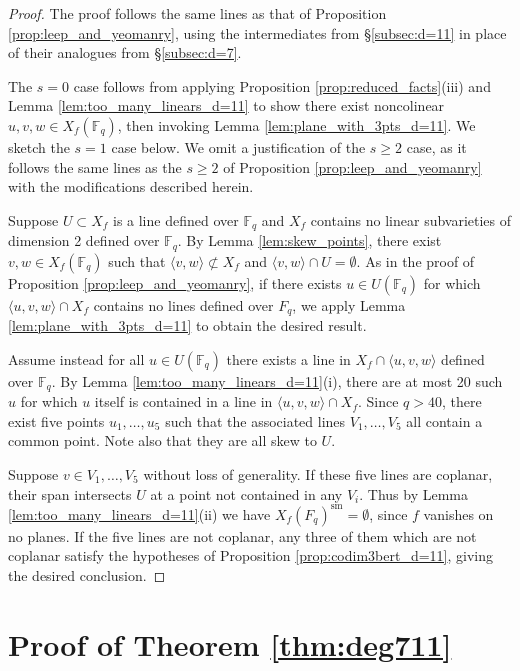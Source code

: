 \documentclass{amsart}
\newcommand{\F}{\mathbb{F}}
\newcommand{\Span}[1]{\langle #1 \rangle}
\newcommand{\sm}{\mathrm{sm}}
\theoremstyle{definition}
\numberwithin{equation}{section}
\numberwithin{table}{section}
\newcommand{\qbound}[1]{{\color{cyan}$q > {#1}$}}
\renewcommand{\qbound}[1]{{$q > {#1}$}}
\begin{document}
\begin{proof}
    The proof follows the same lines as that of Proposition \ref{prop:leep_and_yeomanry}, using the intermediates from \S \ref{subsec:d=11} in place of their analogues from \S \ref{subsec:d=7}.
    
    The $s=0$ case follows from applying Proposition \ref{prop:reduced_facts}(iii) and Lemma \ref{lem:too_many_linears_d=11} to show there exist noncolinear $u,v,w \in X_f(\F_q)$, then invoking Lemma \ref{lem:plane_with_3pts_d=11}. We sketch the $s=1$ case below. We omit a justification of the $s \geq 2$ case, as it follows the same lines as the $s \geq 2$ of Proposition \ref{prop:leep_and_yeomanry} with the modifications described herein.

    Suppose $U \subset X_f$ is a line defined over $\F_q$ and $X_f$ contains no linear subvarieties of dimension 2 defined over $\F_q$. By Lemma \ref{lem:skew_points}, there exist $v,w \in X_f(\F_q)$ such that $\Span{v,w} \not\subset X_f$ and $\Span{v,w} \cap U = \emptyset$. As in the proof of Proposition \ref{prop:leep_and_yeomanry}, if there exists $u \in U(\F_q)$ for which $\Span{u,v,w} \cap X_f$ contains no lines defined over $F_q$, we apply Lemma \ref{lem:plane_with_3pts_d=11} to obtain the desired result.

    Assume instead for all $u \in U(\F_q)$ there exists a line in  $X_f \cap \Span{u,v,w}$ defined over $\F_q$. By Lemma \ref{lem:too_many_linears_d=11}(i), there are at most 20 such $u$ for which $u$ itself is contained in a line in $\Span{u,v,w} \cap X_f$. Since \qbound{40}, there exist five points $u_1,\ldots,u_5$ such that the associated lines $V_1,\ldots,V_5$ all contain a common point. Note also that they are all skew to $U$.
    
    Suppose $v \in V_1,\ldots,V_5$ without loss of generality. If these five lines are coplanar, their span intersects $U$ at a point not contained in any $V_i$. Thus by Lemma \ref{lem:too_many_linears_d=11}(ii) we have $X_f(F_q)^\sm = \emptyset$, since $f$ vanishes on no planes. If the five lines are not coplanar, any three of them which are not coplanar satisfy the hypotheses of Proposition \ref{prop:codim3bert_d=11}, giving the desired conclusion.
\end{proof}

\section{Proof of Theorem \ref{thm:deg711}}\label{sec:proof of thmC}
\end{document}
